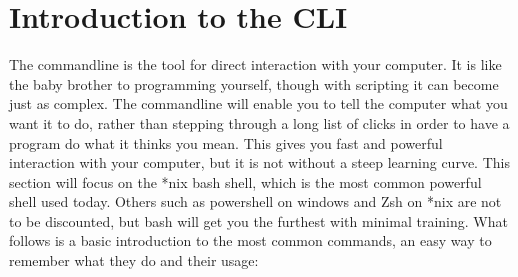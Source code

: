 \documentclass[a4paper,11pt]{report}
\begin{document}
	\section{Introduction to the CLI}
		The commandline is the tool for direct interaction with your computer. 
		It is like the baby brother to programming yourself, though with scripting it can become just as complex. 
		The commandline will enable you to tell the computer what you want it to do, rather than stepping through a long list of clicks in order to have a program do what it thinks you mean. 
		This gives you fast and powerful interaction with your computer, but it is not without a steep learning curve. 
		This section will focus on the \**nix bash shell, which is the most common powerful shell used today. 
		Others such as powershell on windows and Zsh on \**nix are not to be discounted, but bash will get you the furthest with minimal training.  
		What follows is a basic introduction to the most common commands, an easy way to remember what they do and their usage:
\end{document}

